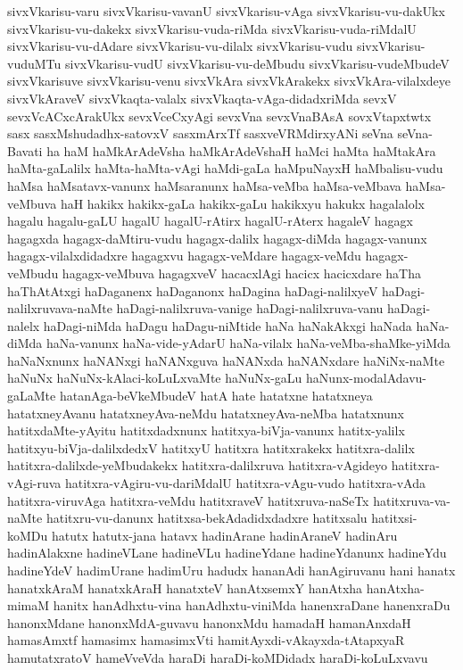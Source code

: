 {sivxVkarisu-varu
sivxVkarisu-vavanU
sivxVkarisu-vAga
sivxVkarisu-vu-dakUkx
sivxVkarisu-vu-dakekx
sivxVkarisu-vuda-riMda
sivxVkarisu-vuda-riMdalU
sivxVkarisu-vu-dAdare
sivxVkarisu-vu-dilalx
sivxVkarisu-vudu
sivxVkarisu-vuduMTu
sivxVkarisu-vudU
sivxVkarisu-vu-deMbudu
sivxVkarisu-vudeMbudeV
sivxVkarisuve
sivxVkarisu-venu
sivxVkAra
sivxVkArakekx
sivxVkAra-vilalxdeye
sivxVkAraveV
sivxVkaqta-valalx
sivxVkaqta-vAga-didadxriMda
sevxV
sevxVcACxcArakUkx
sevxVceCxyAgi
sevxVna
sevxVnaBAsA
sovxVtapxtwtx
sasx
sasxMshudadhx-satovxV
sasxmArxTf
sasxveVRMdirxyANi
seVna
seVna-Bavati
ha
haM
haMkArAdeVsha
haMkArAdeVshaH
haMci
haMta
haMtakAra
haMta-gaLalilx
haMta-haMta-vAgi
haMdi-gaLa
haMpuNayxH
haMbalisu-vudu
haMsa
haMsatavx-vanunx
haMsaranunx
haMsa-veMba
haMsa-veMbava
haMsa-veMbuva
haH
hakikx
hakikx-gaLa
hakikx-gaLu
hakikxyu
hakukx
hagalalolx
hagalu
hagalu-gaLU
hagalU
hagalU-rAtirx
hagalU-rAterx
hagaleV
hagagx
hagagxda
hagagx-daMtiru-vudu
hagagx-dalilx
hagagx-diMda
hagagx-vanunx
hagagx-vilalxdidadxre
hagagxvu
hagagx-veMdare
hagagx-veMdu
hagagx-veMbudu
hagagx-veMbuva
hagagxveV
hacacxlAgi
hacicx
hacicxdare
haTha
haThAtAtxgi
haDaganenx
haDaganonx
haDagina
haDagi-nalilxyeV
haDagi-nalilxruvava-naMte
haDagi-nalilxruva-vanige
haDagi-nalilxruva-vanu
haDagi-nalelx
haDagi-niMda
haDagu
haDagu-niMtide
haNa
haNakAkxgi
haNada
haNa-diMda
haNa-vanunx
haNa-vide-yAdarU
haNa-vilalx
haNa-veMba-shaMke-yiMda
haNaNxnunx
haNANxgi
haNANxguva
haNANxda
haNANxdare
haNiNx-naMte
haNuNx
haNuNx-kAlaci-koLuLxvaMte
haNuNx-gaLu
haNunx-modalAdavu-gaLaMte
hatanAga-beVkeMbudeV
hatA
hate
hatatxne
hatatxneya
hatatxneyAvanu
hatatxneyAva-neMdu
hatatxneyAva-neMba
hatatxnunx
hatitxdaMte-yAyitu
hatitxdadxnunx
hatitxya-biVja-vanunx
hatitx-yalilx
hatitxyu-biVja-dalilxdedxV
hatitxyU
hatitxra
hatitxrakekx
hatitxra-dalilx
hatitxra-dalilxde-yeMbudakekx
hatitxra-dalilxruva
hatitxra-vAgideyo
hatitxra-vAgi-ruva
hatitxra-vAgiru-vu-dariMdalU
hatitxra-vAgu-vudo
hatitxra-vAda
hatitxra-viruvAga
hatitxra-veMdu
hatitxraveV
hatitxruva-naSeTx
hatitxruva-va-naMte
hatitxru-vu-danunx
hatitxsa-bekAdadidxdadxre
hatitxsalu
hatitxsi-koMDu
hatutx
hatutx-jana
hatavx
hadinArane
hadinAraneV
hadinAru
hadinAlakxne
hadineVLane
hadineVLu
hadineYdane
hadineYdanunx
hadineYdu
hadineYdeV
hadimUrane
hadimUru
hadudx
hananAdi
hanAgiruvanu
hani
hanatx
hanatxkAraM
hanatxkAraH
hanatxteV
hanAtxsemxY
hanAtxha
hanAtxha-mimaM
hanitx
hanAdhxtu-vina
hanAdhxtu-viniMda
hanenxraDane
hanenxraDu
hanonxMdane
hanonxMdA-guvavu
hanonxMdu
hamadaH
hamanAnxdaH
hamasAmxtf
hamasimx
hamasimxVti
hamitAyxdi-vAkayxda-tAtapxyaR
hamutatxratoV
hameVveVda
haraDi
haraDi-koMDidadx
haraDi-koLuLxvavu
}
